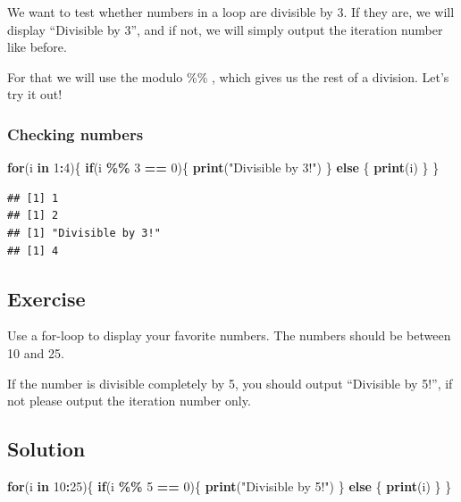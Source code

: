 \documentclass[
]{book}
\newenvironment{Shaded}{\begin{snugshade}}{\end{snugshade}}
\newcommand{\ControlFlowTok}[1]{\textcolor[rgb]{0.13,0.29,0.53}{\textbf{#1}}}
\newcommand{\DecValTok}[1]{\textcolor[rgb]{0.00,0.00,0.81}{#1}}
\newcommand{\FunctionTok}[1]{\textcolor[rgb]{0.13,0.29,0.53}{\textbf{#1}}}
\newcommand{\NormalTok}[1]{#1}
\newcommand{\SpecialCharTok}[1]{\textcolor[rgb]{0.81,0.36,0.00}{\textbf{#1}}}
\newcommand{\StringTok}[1]{\textcolor[rgb]{0.31,0.60,0.02}{#1}}
\begin{document}
We want to test whether numbers in a loop are divisible by 3. If they are, we will display ``Divisible by 3'', and if not, we will simply output the iteration number like before.

For that we will use the modulo \%\% , which gives us the rest of a division. Let's try it out!

\subsubsection{Checking numbers \textbar\textbar{}}\label{checking-numbers-1}

\begin{Shaded}
\begin{Highlighting}[]
\ControlFlowTok{for}\NormalTok{(i }\ControlFlowTok{in} \DecValTok{1}\SpecialCharTok{:}\DecValTok{4}\NormalTok{)\{}
  \ControlFlowTok{if}\NormalTok{(i }\SpecialCharTok{\%\%} \DecValTok{3} \SpecialCharTok{==} \DecValTok{0}\NormalTok{)\{}
    \FunctionTok{print}\NormalTok{(}\StringTok{"Divisible by 3!"}\NormalTok{)}
\NormalTok{  \} }\ControlFlowTok{else}\NormalTok{ \{}
    \FunctionTok{print}\NormalTok{(i) }
\NormalTok{  \}}
\NormalTok{\}}
\end{Highlighting}
\end{Shaded}

\begin{verbatim}
## [1] 1
## [1] 2
## [1] "Divisible by 3!"
## [1] 4
\end{verbatim}

\subsection{Exercise}\label{exercise-4}

Use a for-loop to display your favorite numbers.
The numbers should be between 10 and 25.

If the number is divisible completely by 5, you should output ``Divisible by 5!'', if not please output the iteration number only.

\subsection{Solution}\label{solution-6}

\begin{Shaded}
\begin{Highlighting}[]
\ControlFlowTok{for}\NormalTok{(i }\ControlFlowTok{in} \DecValTok{10}\SpecialCharTok{:}\DecValTok{25}\NormalTok{)\{}
  \ControlFlowTok{if}\NormalTok{(i }\SpecialCharTok{\%\%} \DecValTok{5} \SpecialCharTok{==} \DecValTok{0}\NormalTok{)\{}
    \FunctionTok{print}\NormalTok{(}\StringTok{"Divisible by 5!"}\NormalTok{)}
\NormalTok{  \} }\ControlFlowTok{else}\NormalTok{ \{}
    \FunctionTok{print}\NormalTok{(i) }
\NormalTok{  \}}
\NormalTok{\}}
\end{Highlighting}
\end{Shaded}
\end{document}
